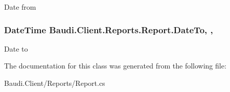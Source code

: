 Date from 

\hypertarget{class_baudi_1_1_client_1_1_reports_1_1_report_a8c58ed65a345287730db36cc1a1e676b}{}
\subsubsection[{Date\+To}]{\setlength{\rightskip}{0pt plus 5cm}Date\+Time Baudi.\+Client.\+Reports.\+Report.\+Date\+To\hspace{0.3cm}{\ttfamily [get]}, {\ttfamily [set]}, {\ttfamily [protected]}}\label{class_baudi_1_1_client_1_1_reports_1_1_report_a8c58ed65a345287730db36cc1a1e676b}


Date to 



The documentation for this class was generated from the following file\+:\begin{DoxyCompactItemize}
\item 
Baudi.\+Client/\+Reports/Report.\+cs\end{DoxyCompactItemize}
